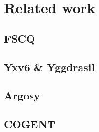 \section{Related work}
\subsection{FSCQ}
\subsection{Yxv6 \& Yggdrasil}
\subsection{Argosy}
\subsection{COGENT}


